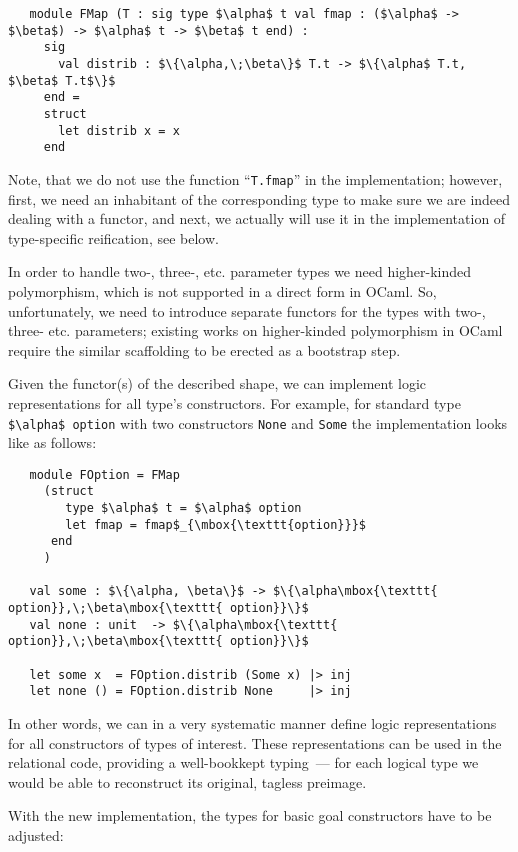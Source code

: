 \begin{lstlisting}
   module FMap (T : sig type $\alpha$ t val fmap : ($\alpha$ -> $\beta$) -> $\alpha$ t -> $\beta$ t end) :
     sig
       val distrib : $\{\alpha,\;\beta\}$ T.t -> $\{\alpha$ T.t, $\beta$ T.t$\}$
     end =
     struct
       let distrib x = x
     end
\end{lstlisting}

Note, that we do not use the function ``\lstinline{T.fmap}'' in the implementation; however, first, we need an inhabitant of the
corresponding type to make sure we are indeed dealing with a functor, and next, we actually will use it in the
implementation of type-specific reification, see below.

In order to handle two-, three-, etc. parameter types we need higher-kinded polymorphism, which is
not supported in a direct form in OCaml. So, unfortunately, we need to introduce separate
functors for the types with two-, three- etc. parameters; existing works on higher-kinded
polymorphism in OCaml~\cite{HKinded} require the similar scaffolding to be erected as a bootstrap step.

Given the functor(s) of the described shape, we can implement logic representations for
all type's constructors. For example, for standard type \lstinline{$\alpha$ option} with two constructors
\lstinline{None} and \lstinline{Some} the implementation looks like as follows:

\begin{lstlisting}
   module FOption = FMap
     (struct
        type $\alpha$ t = $\alpha$ option
        let fmap = fmap$_{\mbox{\texttt{option}}}$
      end
     )

   val some : $\{\alpha, \beta\}$ -> $\{\alpha\mbox{\texttt{ option}},\;\beta\mbox{\texttt{ option}}\}$
   val none : unit  -> $\{\alpha\mbox{\texttt{ option}},\;\beta\mbox{\texttt{ option}}\}$

   let some x  = FOption.distrib (Some x) |> inj
   let none () = FOption.distrib None     |> inj
\end{lstlisting}

In other words, we can in a very systematic manner define logic representations for all constructors
of types of interest. These representations can be used in the relational code, providing a well-bookkept
typing~--- for each logical type we would be able to reconstruct its original, tagless preimage.

With the new implementation, the types for basic goal constructors have to be adjusted:

